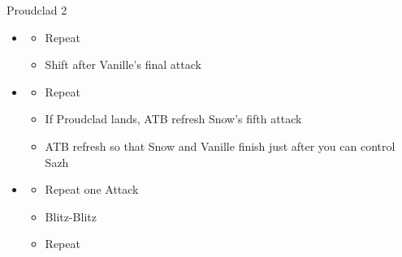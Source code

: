 \begin{battle}[2:01]{Proudclad 2}
\begin{itemize}
\begin{itemize}
				      \item \textit{Oneiric Maelstrom}:
				            \begin{itemize}
					            \item Renew to prevent Sazh from Launching
					            \item Auto-Chain 2 spells
					            \item Cold Blood
				            \end{itemize}
				      \item \textit{Muon Blaster $\rightarrow$ Oneiric Maelstrom}
				            \begin{itemize}
					            \item Renew to prevent Sazh from Launching
					            \item Cold Blood
				            \end{itemize}
				      \item \textit{Muon Blaster $\rightarrow$ Muon Blaster}
				            \begin{itemize}
					            \item Cold Blood to prevent Sazh's interruption
				            \end{itemize}
				      \item ATB refresh after Cold Blood starts to maximize Launches
			      \end{itemize}
			\item \fifth
			      \begin{itemize}
				      \item Repeat
				      \item Shift after Vanille's final attack
			      \end{itemize}
			\item \first
			      \begin{itemize}
				      \item Repeat
				      \item If Proudclad lands, ATB refresh Snow's fifth attack
				      \item ATB refresh so that Snow and Vanille finish just after you can control Sazh
			      \end{itemize}
			\item \second
			      \begin{itemize}
				      \item Repeat one Attack
				      \item Blitz-Blitz
				      \item Repeat
			      \end{itemize}

\end{itemize}
\end{battle}
